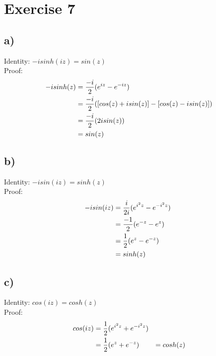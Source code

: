 \documentclass[notitlepage]{article}
\newcommand{\HwBreak}{%
  \par\noindent\makebox[\linewidth]{\rule{0.9\paperwidth}{0.4pt}}\par%
}
\begin{document}
\HwBreak
\section*{Exercise 7}
\subsection*{a)}
    Identity: $-isinh(iz)=sin(z)$ \\
    Proof: \\
\begin{equation}
    \begin{aligned}
        -isinh(z)   &= \frac{-i}{2}(e^{iz}-e^{-iz}) \notag \\
                    &= \frac{-i}{2}([cos(z)+isin(z)] - [cos(z)-isin(z)])\\
                    &= \frac{-i}{2}(2isin(z))\\
                    &= sin(z)
    \end{aligned}
\end{equation}
\subsection*{b)}
    Identity: $-isin(iz)=sinh(z)$ \\
    Proof: \\
\begin{equation}
    \begin{aligned}
        -isin(iz)   &= \frac{i}{2i}(e^{i^2z}-e^{-i^2z})\ \notag \\
                    &= \frac{-1}{2}(e^{-z}-e^z)\\
                    &= \frac{1}{2}(e^z-e^{-z})\\
                    &= sinh(z)
    \end{aligned}
\end{equation}

\subsection*{c)}
    Identity: $cos(iz) = cosh(z)$ \\
    Proof: \\
\begin{equation}
    \begin{aligned}
        cos(iz)     &= \frac{1}{2}(e^{i^2z}+e^{-i^2z}) \notag \\
                    &= \frac{1}{2}(e^z+e^{-z}) 
                    &= cosh(z)
    \end{aligned}
\end{equation} 
\end{document}
